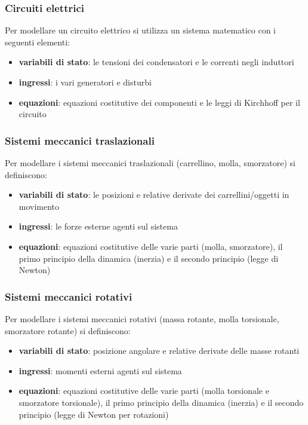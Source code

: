 \subsubsection*{Circuiti elettrici}
Per modellare un circuito elettrico si utilizza un sistema matematico con i seguenti elementi:
\begin{itemize}
	\item \textbf{variabili di stato}: le tensioni dei condensatori e le correnti negli induttori
	\item \textbf{ingressi}: i vari generatori e disturbi
	\item \textbf{equazioni}: equazioni costitutive dei componenti e le leggi di Kirchhoff per il circuito
\end{itemize}

\subsubsection*{Sistemi meccanici traslazionali}
Per modellare i sistemi meccanici traslazionali (carrellino, molla, smorzatore) si definiscono:
\begin{itemize}
	\item \textbf{variabili di stato}: le posizioni e relative derivate dei carrellini/oggetti in movimento
	\item \textbf{ingressi}: le forze esterne agenti sul sistema
	\item \textbf{equazioni}: equazioni costitutive delle varie parti (molla, smorzatore), il primo principio della dinamica
	(inerzia) e il secondo principio (legge di Newton)
\end{itemize}

\subsubsection*{Sistemi meccanici rotativi}
Per modellare i sistemi meccanici rotativi (massa rotante, molla torsionale, smorzatore rotante) si definiscono:
\begin{itemize}
	\item \textbf{variabili di stato}: posizione angolare e relative derivate delle masse rotanti
	\item \textbf{ingressi}: momenti esterni agenti sul sistema
	\item \textbf{equazioni}: equazioni costitutive delle varie parti (molla torsionale e smorzatore torsionale), il primo
	principio della dinamica (inerzia) e il secondo principio (legge di Newton per rotazioni)
\end{itemize}

